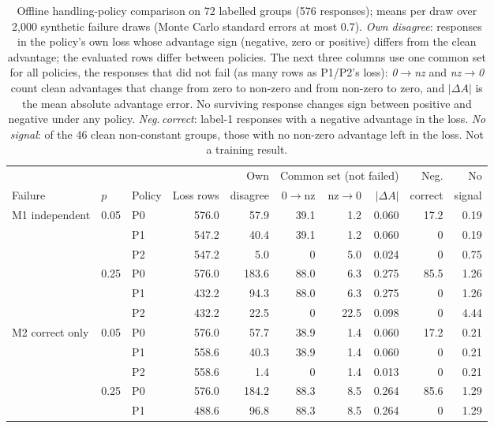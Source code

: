 \documentclass[10pt,a4paper]{article}
\begin{document}
\begin{table}[h]
\centering
\caption{Offline handling-policy comparison on 72 labelled groups (576
responses); means per draw over 2,000 synthetic failure draws (Monte Carlo
standard errors at most 0.7). \emph{Own disagree}: responses in the policy's
own loss whose advantage sign (negative, zero or positive) differs from the
clean advantage; the evaluated rows differ between policies. The next three
columns use one common set for all policies, the responses that did not fail
(as many rows as P1/P2's loss): \emph{0$\to$nz} and \emph{nz$\to$0} count
clean advantages that change from zero to non-zero and from non-zero to zero,
and $|\Delta A|$ is the mean absolute advantage error. No surviving response
changes sign between positive and negative under any policy. \emph{Neg.\,correct}:
label-1 responses with a negative advantage in the loss. \emph{No signal}: of
the 46 clean non-constant groups, those with no non-zero advantage left in the
loss. Not a training result.}
\label{tab:policies}
\footnotesize
\setlength{\tabcolsep}{4pt}
\begin{tabular}{@{}lllrrrrrrr@{}}
\toprule
 & & & & Own & \multicolumn{3}{c}{Common set (not failed)} & Neg. & No \\
\cmidrule(lr){6-8}
Failure & $p$ & Policy & Loss rows & disagree & 0$\to$nz & nz$\to$0 & $|\Delta A|$ & correct & signal \\
\midrule
M1 independent & 0.05 & P0 & 576.0 & 57.9 & 39.1 & 1.2 & 0.060 & 17.2 & 0.19 \\
 &  & P1 & 547.2 & 40.4 & 39.1 & 1.2 & 0.060 & 0 & 0.19 \\
 &  & P2 & 547.2 & 5.0 & 0 & 5.0 & 0.024 & 0 & 0.75 \\
 & 0.25 & P0 & 576.0 & 183.6 & 88.0 & 6.3 & 0.275 & 85.5 & 1.26 \\
 &  & P1 & 432.2 & 94.3 & 88.0 & 6.3 & 0.275 & 0 & 1.26 \\
 &  & P2 & 432.2 & 22.5 & 0 & 22.5 & 0.098 & 0 & 4.44 \\
\addlinespace
M2 correct only & 0.05 & P0 & 576.0 & 57.7 & 38.9 & 1.4 & 0.060 & 17.2 & 0.21 \\
 &  & P1 & 558.6 & 40.3 & 38.9 & 1.4 & 0.060 & 0 & 0.21 \\
 &  & P2 & 558.6 & 1.4 & 0 & 1.4 & 0.013 & 0 & 0.21 \\
 & 0.25 & P0 & 576.0 & 184.2 & 88.3 & 8.5 & 0.264 & 85.6 & 1.29 \\
 &  & P1 & 488.6 & 96.8 & 88.3 & 8.5 & 0.264 & 0 & 1.29 \\

\end{tabular}
\end{table}
\end{document}
